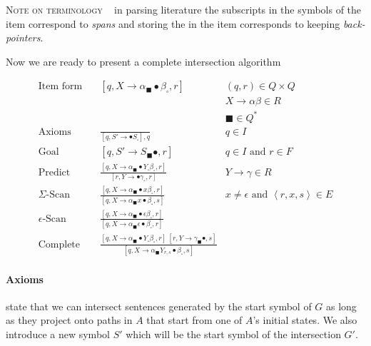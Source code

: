 \documentclass[11pt]{article}
\newcommand{\itembrack}[1]{\ensuremath{\left[ #1 \right]}}
\newcommand{\angbrack}[1]{\ensuremath{\left\langle #1 \right\rangle}}
\begin{document}
\noindent\textsc{Note on terminology} ~ in parsing literature the subscripts in the symbols of the item correspond to \emph{spans} and storing the in the item corresponds to keeping \emph{back-pointers}.


Now we are ready to present a complete intersection algorithm

\begin{align}
\text{Item form} &\quad  \itembrack{q, X \rightarrow \alpha_\blacksquare \bullet \beta_\square, r} & (q,r) \in Q\times Q \\
 & & X \rightarrow \alpha \beta \in R \nonumber \\
 & & \blacksquare \in Q^* \nonumber \\
\text{Axioms} &\quad \frac{}{\itembrack{q, S' \rightarrow \bullet S_\square}, q} & q \in I\\
\text{Goal} &\quad \itembrack{q, S' \rightarrow S_\blacksquare \bullet, r} & q \in I \text{ and } r \in F\\
\text{Predict} &\quad \frac{\itembrack{q, X \rightarrow \alpha_\blacksquare \bullet Y_\square \beta_\square, r}}{\itembrack{r, Y \rightarrow \bullet \gamma_\square, r}} & Y \rightarrow \gamma \in R \\
\Sigma\text{-Scan} &\quad \frac{\itembrack{q, X \rightarrow \alpha_\blacksquare \bullet x \beta_\square, r}}{\itembrack{q, X \rightarrow \alpha_\blacksquare x \bullet \beta_\square, s}} & x \neq \epsilon \text{ and } \angbrack{r, x, s} \in E \\
\epsilon\text{-Scan} &\quad \frac{\itembrack{q, X \rightarrow \alpha_\blacksquare \bullet \epsilon \beta_\square, r}}{\itembrack{q, X \rightarrow \alpha_\blacksquare \epsilon \bullet \beta_\square, r}} & \\
\text{Complete} &\quad \frac{\itembrack{q, X \rightarrow \alpha_\blacksquare \bullet Y_\square \beta_\square, r} ~ \itembrack{r, Y \rightarrow \gamma_\blacksquare \bullet, s}}{\itembrack{q, X \rightarrow \alpha_\blacksquare Y_{r,s} \bullet \beta_\square, s}}
\end{align}


\paragraph{Axioms} state that we can intersect sentences generated by the start symbol of $G$ as long as they project onto paths in $A$ that start from one of $A$'s initial states. We also introduce a new symbol $S'$ which will be the start symbol of the intersection $G'$.
\end{document}
